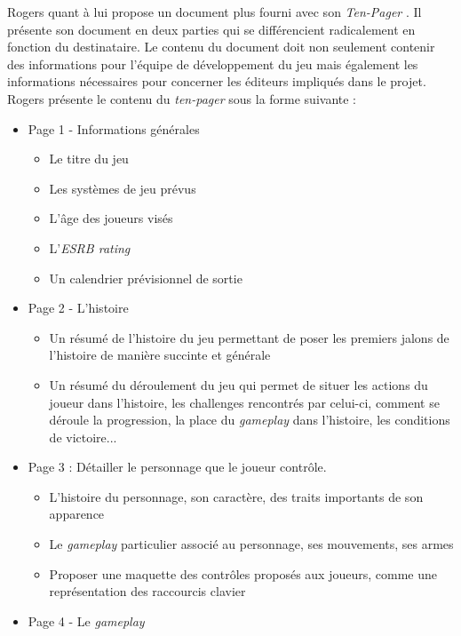 Rogers \cite{LevelUpRogers2014} quant à lui propose un document plus fourni avec son \emph{\guillemotleft Ten-Pager \guillemotright}. Il présente son document en deux parties qui se différencient radicalement en fonction du destinataire. Le contenu du document doit non seulement contenir des informations pour l'équipe de développement du jeu mais également les informations nécessaires pour concerner les éditeurs impliqués dans le projet. Rogers présente le contenu du \emph{ten-pager} sous la forme suivante :
\begin{itemize}
    \item Page 1 - Informations générales
    \begin{itemize}
        \item Le titre du jeu
        \item Les systèmes de jeu prévus
        \item L'âge des joueurs visés
        \item L'\emph{ESRB rating}
        \item Un calendrier prévisionnel de sortie
    \end{itemize}
    \item Page 2 - L'histoire
    \begin{itemize}
        \item Un résumé de l'histoire du jeu permettant de poser les premiers jalons de l'histoire de manière succinte et générale
        \item Un résumé du déroulement du jeu qui permet de situer les actions du joueur dans l'histoire, les challenges rencontrés par celui-ci, comment se déroule la progression, la place du \emph{gameplay} dans l'histoire, les conditions de victoire...
    \end{itemize}
    \item Page 3 : Détailler le personnage que le joueur contrôle.
    \begin{itemize}
        \item L'histoire du personnage, son caractère, des traits importants de son apparence
        \item Le \emph{gameplay} particulier associé au personnage, ses mouvements, ses armes
        \item Proposer une maquette des contrôles proposés aux joueurs, comme une représentation des raccourcis clavier
    \end{itemize}
    \item Page 4 - Le \emph{gameplay} 
    \begin{itemize}

\end{itemize}
\end{itemize}
